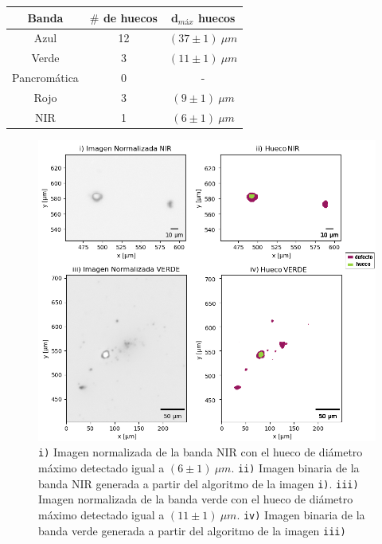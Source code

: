 \begin{table}[H]
\begin{center}
\begin{tabular}{ |c|c|c|}    \toprule
Banda & $\#$ de huecos & d$_{máx}$ huecos \\\midrule
\rowcolor{blue!15} Azul   & 12  & $(37 \pm 1)~ \mu m$  \\ 
\rowcolor{green!50} Verde  & 3 & $(11 \pm 1)~ \mu m$ \\ 
Pancromática & 0 & - \\
\rowcolor{red!50} Rojo  & 3 & $(9 \pm 1)~ \mu m$ \\
\rowcolor{maroon!20} NIR   & 1 & $(6 \pm 1)~ \mu m$ \\
\bottomrule
 \hline
\end{tabular}
\end{center}
 \label{tabaguj}
\end{table}


 \begin{figure}[H]
\centering
\includegraphics[scale=1.0]{Figs/cuantificaciondefectos/agujerross.png}
\caption{\texttt{i)} Imagen normalizada de la banda NIR con el hueco de diámetro máximo detectado igual a $(6 \pm 1)~ \mu m$. \texttt{ii)} Imagen binaria de la banda NIR generada a partir del algoritmo de la imagen \texttt{i)}. \texttt{iii)} Imagen normalizada de la banda verde con el hueco de diámetro máximo detectado igual a $(11 \pm 1)~ \mu m$. \texttt{iv)} Imagen binaria de la banda verde generada a partir del algoritmo de la imagen \texttt{iii)}}
\label{fig:aggjj}
\end{figure}

